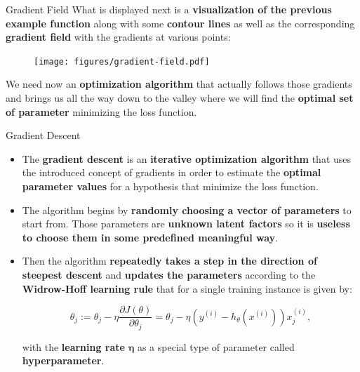 \documentclass[main.tex]{subfiles}
\begin{document}
    \begin{frame}{Gradient Field}
        What is displayed next is a \textbf{visualization of the previous example function} along with some \textbf{contour lines} as well as the corresponding \textbf{gradient field} with the gradients at various points:
        
        \begin{figure}
            \label{fig:gradient-field}
            \texttt{[image: figures/gradient-field.pdf]}
        \end{figure}
        
        \vspace*{-3mm}
        We need now an \textbf{optimization algorithm} that actually follows those gradients and brings us all the way down to the valley where we will find the \textbf{optimal set of parameter} minimizing the loss function. 
    \end{frame}

    \begin{frame}{Gradient Descent}
        \begin{itemize}
            \item The \textbf{gradient descent} is an \textbf{iterative optimization algorithm} that uses the introduced concept of gradients in order to estimate the \textbf{optimal parameter values} for a hypothesis that minimize the loss function.
            \item The algorithm begins by \textbf{randomly choosing a vector of parameters} to start from. Those parameters are \textbf{unknown latent factors} so it is \textbf{useless to choose them in some predefined meaningful way}.
            \item Then the algorithm \textbf{repeatedly takes a step in the direction of steepest descent} and \textbf{updates the parameters} according to the \textbf{Widrow-Hoff learning rule} that for a single training instance is given by:
            
            $$\theta_j := \theta_j - \eta \frac{\partial J(\theta)}{\partial \theta_j} = \theta_j - \eta (y^{(i)} - h_\theta(x^{(i)}))x^{(i)}_j,$$
            
            with the \textbf{learning rate} $\pmb{\eta}$ as a special type of parameter called \textbf{hyperparameter}.
        \end{itemize}
    \end{frame}	
\end{document}
